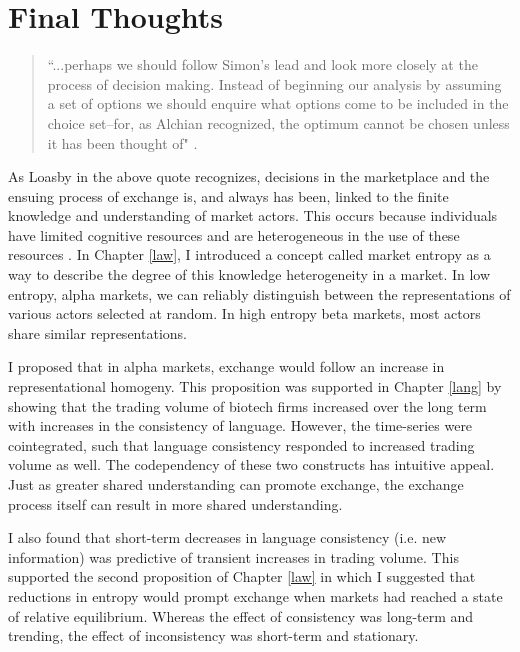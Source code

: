 \chapter{Final Thoughts \label{final}}


\begin{small}
\begin{quote}
``...perhaps we should follow Simon's lead and look more closely at the process of decision making. Instead of beginning our analysis by assuming a set of options we should enquire what options come to be included in the choice set--for, as Alchian recognized, the optimum cannot be chosen unless it has been thought of" \citep[p. 31]{loasby1999}. 
\end{quote}
\end{small}

As Loasby in the above quote recognizes, decisions in the marketplace and the ensuing process of exchange is, and always has been, linked to the finite knowledge and understanding of market actors. This occurs because individuals have limited cognitive resources and are heterogeneous in the use of these resources \citep{simon1957}. In Chapter \ref{law}, I introduced a concept called market entropy as a way to describe the degree of this knowledge heterogeneity in a market. In low entropy, alpha markets, we can reliably distinguish between the representations of various actors selected at random. In high entropy beta markets, most actors share similar representations.

I proposed that in alpha markets, exchange would follow an increase in representational homogeny. This proposition was supported in Chapter \ref{lang} by showing that the trading volume of biotech firms increased over the long term with increases in the consistency of language. However, the time-series were cointegrated, such that language consistency responded to increased trading volume as well. The codependency of these two constructs has intuitive appeal.  Just as greater shared understanding can promote exchange, the exchange process itself can result in more shared understanding.

I also found that short-term decreases in language consistency (i.e. new information) was predictive of transient increases in trading volume. This supported the second proposition of Chapter \ref{law} in which I suggested that reductions in entropy would prompt exchange when markets had reached a state of relative equilibrium. Whereas the effect of consistency was long-term and trending, the effect of inconsistency was short-term and stationary.

